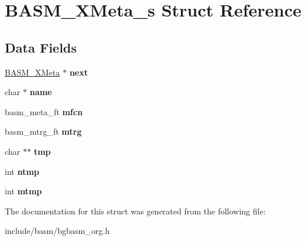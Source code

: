\hypertarget{structBASM__XMeta__s}{\section{B\-A\-S\-M\-\_\-\-X\-Meta\-\_\-s Struct Reference}
\label{structBASM__XMeta__s}
}
\subsection*{Data Fields}
\begin{DoxyCompactItemize}
\item 
\hypertarget{structBASM__XMeta__s_a8af2ec841df8e9277001840e32ca879f}{\hyperlink{structBASM__XMeta__s}{B\-A\-S\-M\-\_\-\-X\-Meta} $\ast$ {\bfseries next}}\label{structBASM__XMeta__s_a8af2ec841df8e9277001840e32ca879f}

\item 
\hypertarget{structBASM__XMeta__s_a86e5f6fac9699e5d0ae603fea49769a9}{char $\ast$ {\bfseries name}}\label{structBASM__XMeta__s_a86e5f6fac9699e5d0ae603fea49769a9}

\item 
\hypertarget{structBASM__XMeta__s_a873a16598a03cd80df84b4668ce672fa}{basm\-\_\-meta\-\_\-ft {\bfseries mfcn}}\label{structBASM__XMeta__s_a873a16598a03cd80df84b4668ce672fa}

\item 
\hypertarget{structBASM__XMeta__s_a8217ba3ca3f79ed0c15ff61613b2d189}{basm\-\_\-mtrg\-\_\-ft {\bfseries mtrg}}\label{structBASM__XMeta__s_a8217ba3ca3f79ed0c15ff61613b2d189}

\item 
\hypertarget{structBASM__XMeta__s_afb2c9e26949b1bb8c3cb492795eeefeb}{char $\ast$$\ast$ {\bfseries tmp}}\label{structBASM__XMeta__s_afb2c9e26949b1bb8c3cb492795eeefeb}

\item 
\hypertarget{structBASM__XMeta__s_a1da9fe277c416a9650fd9464a046535f}{int {\bfseries ntmp}}\label{structBASM__XMeta__s_a1da9fe277c416a9650fd9464a046535f}

\item 
\hypertarget{structBASM__XMeta__s_abcbd92d99822846914151fb5c3d06656}{int {\bfseries mtmp}}\label{structBASM__XMeta__s_abcbd92d99822846914151fb5c3d06656}

\end{DoxyCompactItemize}


The documentation for this struct was generated from the following file\-:\begin{DoxyCompactItemize}
\item 
include/basm/bgbasm\-\_\-org.\-h\end{DoxyCompactItemize}
